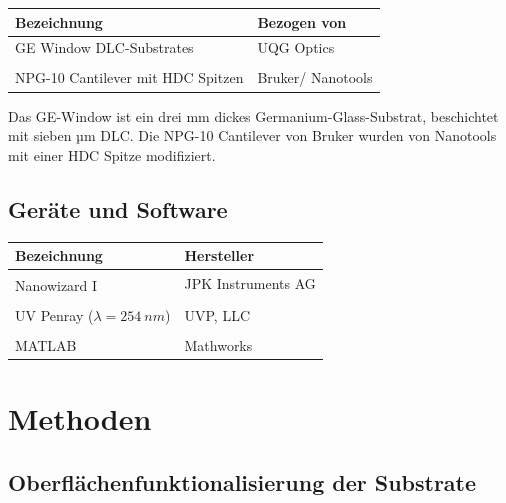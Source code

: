 \begin{table}[H]
	\centering
	\keepXColumns
	\begin{tabularx}{\textwidth}{X X}		
		\textbf{Bezeichnung}	&	\textbf{Bezogen von}	\\
		\toprule
		\toprule
		GE Window DLC-Substrates	&	UQG Optics	\\
		&\\
		NPG-10 Cantilever mit HDC Spitzen	&	Bruker/ Nanotools	\\
		\toprule
		\toprule
	\end{tabularx}
	\label{tab:substrate}
\end{table}

Das GE-Window ist ein drei mm dickes Germanium-Glass-Substrat, beschichtet mit sieben µm \ac{DLC}. Die NPG-10 Cantilever von Bruker wurden von Nanotools mit einer \ac{HDC} Spitze modifiziert.

\subsection{Geräte und Software}
\label{subsec:geräte_und_software}

\begin{table}[H]
	\centering
	\keepXColumns
	\begin{tabularx}{\textwidth}{X X}
		\textbf{Bezeichnung}	&	\textbf{Hersteller}	\\
		\toprule
		\toprule
		Nanowizard I\textsuperscript{\textregistered}	&	JPK Instruments AG	\\
		&\\
		UV Penray ($\lambda = 254~nm$)	&	UVP, LLC	\\
		&\\
		MATLAB	&	Mathworks	\\
		\toprule
		\toprule
	\end{tabularx}
	\label{tab:geräte_software}
\end{table}

\section{Methoden}
\label{sec:methoden}

\subsection{Oberflächenfunktionalisierung der Substrate}
\label{subsec:oberflächenfunktionalisierung_der_substrate}

